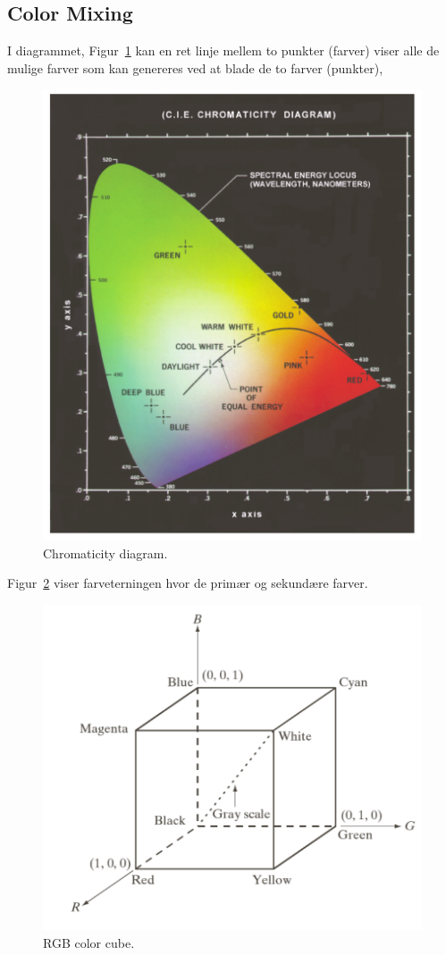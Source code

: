 \subsection{Color Mixing}

I diagrammet, Figur~\ref{fig:chromaticity-diagram} kan en ret linje mellem to punkter (farver) viser alle de mulige farver som kan genereres ved at blade de to farver (punkter),

\begin{figure}[H]
	\centering
	\includegraphics[width=0.7\linewidth]{figs/spm07/chromaticity-diagram}
	\caption{Chromaticity diagram.}
	\label{fig:chromaticity-diagram}
\end{figure}

Figur~\ref{fig:rgb-color-cube} viser farveterningen hvor de primær og sekundære farver.

\begin{figure}[H]
	\centering
	\includegraphics[width=0.7\linewidth]{figs/spm07/rgb-color-cube}
	\caption{RGB color cube.}
	\label{fig:rgb-color-cube}
\end{figure}
